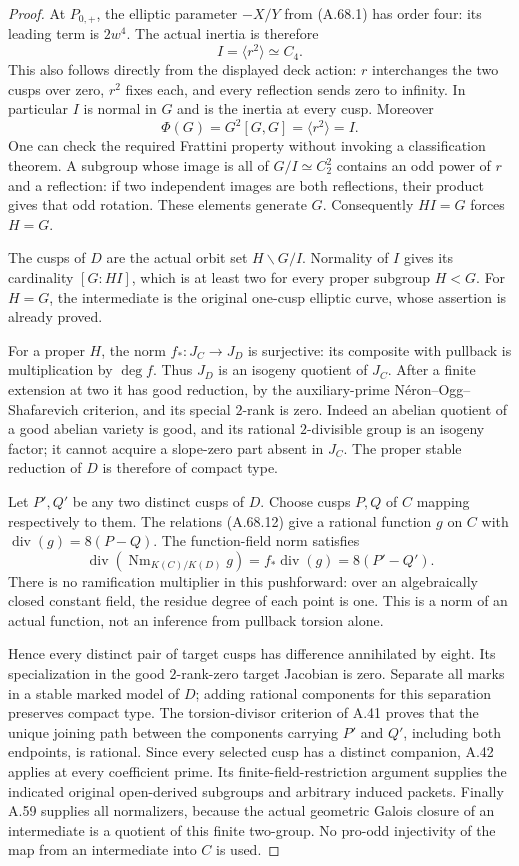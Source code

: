 \begin{proof}
At \(P_{0,+}\), the elliptic parameter \(-X/Y\) from (A.68.1)
has order four: its leading term is \(2w^4\). The actual inertia
is therefore
\[
 I=\langle r^2\rangle\simeq C_4.
\]
This also follows directly from the displayed deck action:
\(r\) interchanges the two cusps over zero, \(r^2\) fixes
each, and every reflection sends zero to infinity. In particular
\(I\) is normal in \(G\) and is the inertia at every cusp.
Moreover
\[
 \Phi(G)=G^2[G,G]=\langle r^2\rangle=I.
\]
One can check the required Frattini property without invoking
a classification theorem. A subgroup whose image is all of
\(G/I\simeq C_2^2\) contains an odd power of \(r\) and a
reflection: if two independent images are both reflections,
their product gives that odd rotation. These elements generate
\(G\). Consequently \(HI=G\) forces \(H=G\).

The cusps of \(D\) are the actual orbit set
\(H\backslash G/I\). Normality of \(I\) gives its cardinality
\([G:HI]\), which is at least two for every proper subgroup
\(H<G\). For \(H=G\), the intermediate is the original
one-cusp elliptic curve, whose assertion is already proved.

For a proper \(H\), the norm
\(f_*:J_C\to J_D\) is surjective: its composite with pullback
is multiplication by \(\deg f\). Thus \(J_D\) is an isogeny
quotient of \(J_C\). After a finite extension at two it has
good reduction, by the auxiliary-prime
N\'eron--Ogg--Shafarevich criterion, and its special \(2\)-rank
is zero. Indeed an abelian quotient of a good abelian variety
is good, and its rational \(2\)-divisible group is an isogeny
factor; it cannot acquire a slope-zero part absent in \(J_C\).
The proper stable reduction of \(D\) is therefore of compact type.

Let \(P',Q'\) be any two distinct cusps of \(D\). Choose
cusps \(P,Q\) of \(C\) mapping respectively to them. The
relations (A.68.12) give a rational function \(g\) on \(C\)
with \(\operatorname{div}(g)=8(P-Q)\). The function-field
norm satisfies
\[
 \operatorname{div}(\operatorname{Nm}_{K(C)/K(D)}g)
       =f_*\operatorname{div}(g)=8(P'-Q').
\]
There is no ramification multiplier in this pushforward: over
an algebraically closed constant field, the residue degree
of each point is one. This is a norm of an actual function,
not an inference from pullback torsion alone.

Hence every distinct pair of target cusps has difference
annihilated by eight. Its specialization in the good
\(2\)-rank-zero target Jacobian is zero. Separate all marks
in a stable marked model of \(D\); adding rational components
for this separation preserves compact type. The torsion-divisor
criterion of A.41 proves that the unique joining path between
the components carrying \(P'\) and \(Q'\), including both
endpoints, is rational. Since every selected cusp has a
distinct companion, A.42 applies at every coefficient prime.
Its finite-field-restriction argument supplies the indicated
original open-derived subgroups and arbitrary induced packets.
Finally A.59 supplies all normalizers, because the actual
geometric Galois closure of an intermediate is a quotient
of this finite two-group. No pro-odd injectivity of the map
from an intermediate into \(C\) is used.


\end{proof}
